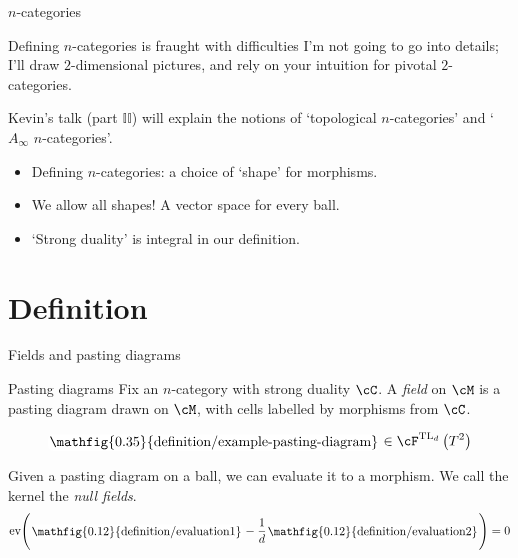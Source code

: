\documentclass[beamer, compress]{beamer}
\begin{document}
\begin{frame}{$n$-categories}
\begin{block}{Defining $n$-categories is fraught with difficulties}
I'm not going to go into details; I'll draw $2$-dimensional pictures, and rely on your intuition for pivotal $2$-categories.
\end{block}
\begin{block}{}
Kevin's talk (part $\mathbb{II}$) will explain the notions of `topological $n$-categories' and `$A_\infty$ $n$-categories'.
\end{block}

\begin{block}{}
\begin{itemize}
\item
Defining $n$-categories: a choice of `shape' for morphisms.
\item
We allow all shapes! A vector space for every ball.
\item
`Strong duality' is integral in our definition.
\end{itemize}
\end{block}
\end{frame}

\newcommand{\roundframe}[1]{\begin{tikzpicture}[baseline=-2pt]\node[rectangle,inner sep=1pt,rounded corners,fill=white] {#1};\end{tikzpicture}}

\section{Definition}
\begin{frame}{Fields and pasting diagrams}
\begin{block}{Pasting diagrams}
Fix an $n$-category with strong duality $\cC$. A \emph{field} on $\cM$ is a pasting diagram drawn on $\cM$, with cells labelled by morphisms from $\cC$.
\end{block}
\begin{example}[$\cC = \text{TL}_d$ the Temperley-Lieb category]
$$\roundframe{\mathfig{0.35}{definition/example-pasting-diagram}} \in \cF^{\text{TL}_d}\left(T^2\right)$$
\end{example}
\begin{block}{}
Given a pasting diagram on a ball, we can evaluate it to a morphism. We call the kernel the \emph{null fields}.
\vspace{-3mm}
$$\text{ev}\Bigg(\roundframe{\mathfig{0.12}{definition/evaluation1}} - \frac{1}{d}\roundframe{\mathfig{0.12}{definition/evaluation2}}\Bigg) = 0$$
\end{block}
\end{frame}
\end{document}
